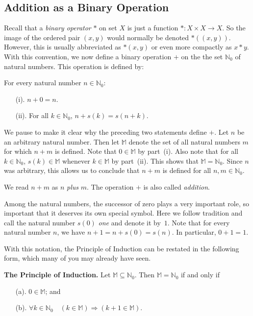 \subsection{Addition as a Binary Operation}\label{s:add}

Recall that a \textit{binary operator} $*$ on set $X$ is just
a function $*:X\times X\rightarrow X$.  So the image of
the ordered pair $(x,y)$ would normally be denoted $*((x,y))$.
However, this is usually abbreviated as $*(x,y)$ or
even more compactly as $x*y$.  With this convention,
we now define a binary operation $+$ 
on the the set $\mathbb{N}_0$ of natural numbers.
This operation is defined by:

For every natural number $n\in\mathbb{N}_0$:
\begin{enumerate}
\item [(i).]  $n+0=n$.
\item [(ii).] For all $k\in\mathbb{N}_0$, $n+s(k) = s(n+k)$.
\end{enumerate}

We pause to make it clear why the preceding two statements
define $+$.  Let $n$ be
an arbitrary natural number.  Then let $\mathbb{M}$ denote the
set of all natural numbers $m$ for which $n+m$ is
defined.  Note that $0\in \mathbb{M}$ by part~(i).  Also note
that for all $k\in \mathbb{N}_0$, $s(k)\in \mathbb{M}$ whenever 
$k\in \mathbb{M}$ by part~(ii).  This
shows that $\mathbb{M}=\mathbb{N}_0$.  Since $n$ was arbitrary, this allows us
to conclude that $n+m$ is defined for all $n,m\in \mathbb{N}_0$.

We read $n+m$ as $n$ \textit{plus} $m$.  The operation $+$
is also called \textit{addition}.  

Among the natural numbers, the successor of zero plays a very
important role, so important that it deserves its own special
symbol.  Here we follow tradition and call the natural number
$s(0)$ \textit{one} and denote it by~$1$.
Note that for every natural number
$n$, we have $n+1=n+s(0)=s(n)$.  In particular, $0+1=1$.

With this notation, the Principle of Induction can be 
restated in the following form, which many of you may already have seen.

\medskip
\noindent
\textbf{The Principle of Induction.}\quad
Let $\mathbb{M}\subseteq \mathbb{N}_0$.  
Then $\mathbb{M} =\mathbb{N}_0$ if and only if
\begin{enumerate}
\item[(a).] $0\in \mathbb{M}$; and 
\item[(b).] $\forall k\in \mathbb{N}_0\quad(k\in \mathbb{M}) 
  \Longrightarrow(k+1\in \mathbb{M})$. 
\end{enumerate}

